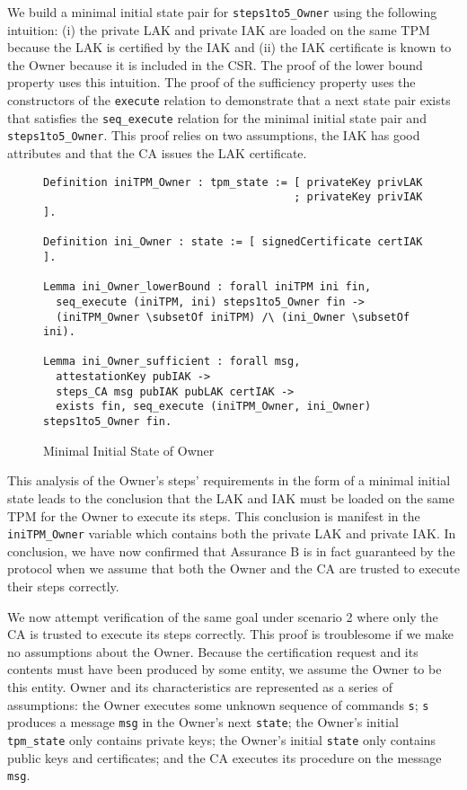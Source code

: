 \documentclass[runningheads]{llncs}
\begin{document}
We build a minimal initial state pair for \verb|steps1to5_Owner| using
the following intuition: (i) the private LAK and private IAK are
loaded on the same TPM because the LAK is certified by the IAK and
(ii) the IAK certificate is known to the Owner because it is included
in the CSR.  The proof of the lower bound property uses this
intuition.  The proof of the sufficiency property uses the
constructors of the \verb|execute| relation to demonstrate that a next
state pair exists that satisfies the \verb|seq_execute| relation for
the minimal initial state pair and \verb|steps1to5_Owner|. This proof
relies on two assumptions, the IAK has good attributes and that the CA
issues the LAK certificate.

\begin{figure}[hbtp]
\begin{lstlisting}[language=Coq]
Definition iniTPM_Owner : tpm_state := [ privateKey privLAK
                                       ; privateKey privIAK ].

Definition ini_Owner : state := [ signedCertificate certIAK ].

Lemma ini_Owner_lowerBound : forall iniTPM ini fin,
  seq_execute (iniTPM, ini) steps1to5_Owner fin ->
  (iniTPM_Owner \subsetOf iniTPM) /\ (ini_Owner \subsetOf ini).

Lemma ini_Owner_sufficient : forall msg,
  attestationKey pubIAK ->
  steps_CA msg pubIAK pubLAK certIAK ->
  exists fin, seq_execute (iniTPM_Owner, ini_Owner) steps1to5_Owner fin.
\end{lstlisting}
\caption{Minimal Initial State of Owner}
\end{figure}

This analysis of the Owner's steps' requirements in the form of a
minimal initial state leads to the conclusion that the LAK and IAK
must be loaded on the same TPM for the Owner to execute its
steps. This conclusion is manifest in the \verb|iniTPM_Owner| variable
which contains both the private LAK and private IAK. In conclusion, we
have now confirmed that Assurance B is in fact guaranteed by the
protocol when we assume that both the Owner and the CA are trusted to
execute their steps correctly.


We now attempt verification of the same goal under scenario 2 where
only the CA is trusted to execute its steps correctly. This proof is
troublesome if we make no assumptions about the Owner.  Because the
certification request and its contents must have been produced by some
entity, we assume the Owner to be this entity.  Owner and its
characteristics are represented as a series of assumptions: the Owner
executes some unknown sequence of commands \verb|s|; \verb|s| produces
a message \verb|msg| in the Owner's next \verb|state|; the Owner's
initial \verb|tpm_state| only contains private keys; the Owner's
initial \verb|state| only contains public keys and certificates; and
the CA executes its procedure on the message \verb|msg|.
\end{document}
